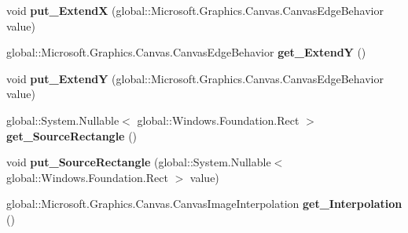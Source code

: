 \begin{DoxyCompactItemize}
\item 
\mbox{\label{class_microsoft_1_1_graphics_1_1_canvas_1_1_brushes_1_1_canvas_image_brush_aca638fc134d4d7aeb045f7af68be64d4}} 
void {\bfseries put\+\_\+\+ExtendX} (global\+::\+Microsoft.\+Graphics.\+Canvas.\+Canvas\+Edge\+Behavior value)
\item 
\mbox{\label{class_microsoft_1_1_graphics_1_1_canvas_1_1_brushes_1_1_canvas_image_brush_a6d17dd87d557c5dd892bcd91ed6d580c}} 
global\+::\+Microsoft.\+Graphics.\+Canvas.\+Canvas\+Edge\+Behavior {\bfseries get\+\_\+\+ExtendY} ()
\item 
\mbox{\label{class_microsoft_1_1_graphics_1_1_canvas_1_1_brushes_1_1_canvas_image_brush_a74ff40530cc12913c1a2aed1c6a29603}} 
void {\bfseries put\+\_\+\+ExtendY} (global\+::\+Microsoft.\+Graphics.\+Canvas.\+Canvas\+Edge\+Behavior value)
\item 
\mbox{\label{class_microsoft_1_1_graphics_1_1_canvas_1_1_brushes_1_1_canvas_image_brush_a026484de4f62a1ee93a4dbe3b556bc35}} 
global\+::\+System.\+Nullable$<$ global\+::\+Windows.\+Foundation.\+Rect $>$ {\bfseries get\+\_\+\+Source\+Rectangle} ()
\item 
\mbox{\label{class_microsoft_1_1_graphics_1_1_canvas_1_1_brushes_1_1_canvas_image_brush_a06ce9ecc2a14f31cc237bf4f1d636c3b}} 
void {\bfseries put\+\_\+\+Source\+Rectangle} (global\+::\+System.\+Nullable$<$ global\+::\+Windows.\+Foundation.\+Rect $>$ value)
\item 
\mbox{\label{class_microsoft_1_1_graphics_1_1_canvas_1_1_brushes_1_1_canvas_image_brush_aa876d16918c915a266a3e9223dc1d6d3}} 
global\+::\+Microsoft.\+Graphics.\+Canvas.\+Canvas\+Image\+Interpolation {\bfseries get\+\_\+\+Interpolation} ()
\item 
\mbox{\label{class_microsoft_1_1_graphics_1_1_canvas_1_1_brushes_1_1_canvas_image_brush_a733530cfb4590949e1eddf304a9e861f}} 

\end{DoxyCompactItemize}
